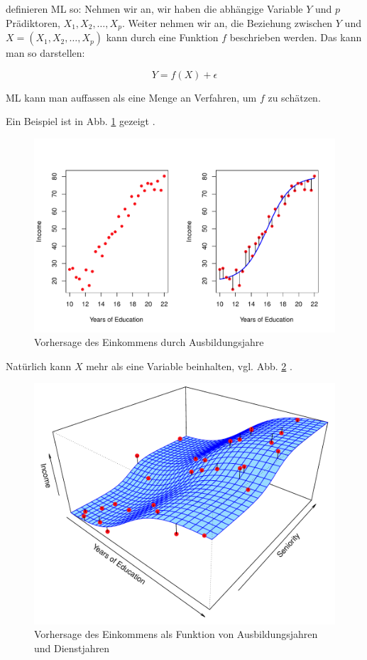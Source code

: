 \documentclass[
]{book}
\begin{document}
\citet{islr} definieren ML so:
Nehmen wir an, wir haben die abhängige Variable \(Y\) und \(p\) Prädiktoren, \(X_1,X_2, \ldots, X_p\).
Weiter nehmen wir an, die Beziehung zwischen \(Y\) und \(X = (X_1, X_2, \ldots, X_p)\) kann durch eine Funktion \(f\) beschrieben werden.
Das kann man so darstellen:

\[Y = f(X) + \epsilon\]

ML kann man auffassen als eine Menge an Verfahren, um \(f\) zu schätzen.

Ein Beispiel ist in Abb. \ref{fig:statlearning} gezeigt \citep{islr}.

\begin{figure}[H]

{\centering \includegraphics[width=0.7\linewidth]{img/2-2} 

}

\caption{Vorhersage des Einkommens durch Ausbildungsjahre}\label{fig:statlearning}
\end{figure}

Natürlich kann \(X\) mehr als eine Variable beinhalten, vgl. Abb. \ref{fig:sl2} \citep{islr}.

\begin{figure}[H]

{\centering \includegraphics[width=0.7\linewidth]{img/2-3} 

}

\caption{Vorhersage des Einkommens als Funktion von Ausbildungsjahren und Dienstjahren}\label{fig:sl2}
\end{figure}
\end{document}
